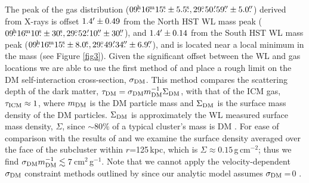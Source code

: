 The peak of the gas distribution ($09\fh16\fm15\fs\pm5.5\fs, 29\fdg50\farcm59\farcs\pm5.0\farcs$) derived from X-rays is offset $1.4\mbox{$^\prime$}\pm0.49$ from the North HST WL mass peak ($09\fh16\fm10\fs\pm30\fs, 29\fdg52\farcm10\farcs\pm30\farcs$), and $1.4\mbox{$^\prime$}\pm0.14$ from the South HST WL mass peak ($09\fh16\fm15\fs\pm8.0\fs, 29\fdg49\farcm34\farcs\pm6.9\farcs$), and is located near a local minimum in the mass (see Figure \ref{fig3}).
Given the significant offset between the WL and gas locations we are able to use the first method of \citet{Markevitch:2004dl} and place a rough limit on the DM self-interaction cross-section, $\sigma_{\rm DM}$.
This method compares the scattering depth of the dark matter, $\tau_{\rm DM}=\sigma_{\rm DM}m^{-1}_{\rm DM} \Sigma_{\rm DM}$, with that of the ICM gas, $\tau_{\rm ICM}\approx 1$, where $m_{\rm DM}$ is the DM particle mass and $\Sigma_{\rm DM}$ is the surface mass density of the DM particles.
$\Sigma_{\rm DM}$ is approximately the WL measured surface mass density, $\Sigma$, since $\sim80\%$ of a typical cluster's mass is DM \citep{Diaferio:2008js}.
For ease of comparison with the results of \citet{Markevitch:2004dl} and \citet{Merten:2011gu} we examine the surface density averaged over the face of the subcluster within $r$=125\,kpc, which is $\Sigma\approx0.15$\,g\,cm$^{-2}$; thus we find $\sigma_{\rm DM} m_{\rm DM}^{-1} \lesssim 7$\,cm$^2$\,g$^{-1}$.  
Note that we cannot apply the velocity-dependent $\sigma_{\rm DM}$ constraint methods outlined by \citet{Markevitch:2004dl} since our analytic model assumes $\sigma_{\rm DM}$\,=\,0 \citep{Dawson:2012dl, Dawson:2012ub}.



